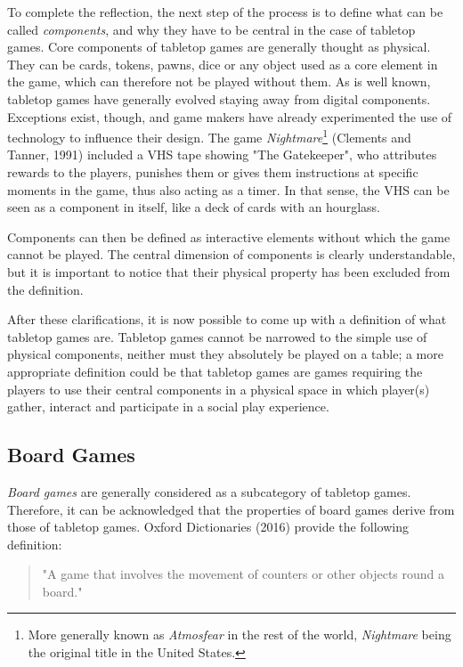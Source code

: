 To complete the reflection, the next step of the process is to define what can be called \textit{components}, and why they have to be central in the case of tabletop games. 
Core components of tabletop games are generally thought as physical. They can be cards, tokens, pawns, dice or any object used as a core element in the game, which can therefore not be played without them. As is well known, tabletop games have generally evolved staying away from digital components. 
Exceptions exist, though, and game makers have already experimented the use of technology to influence their design. The game \textit{Nightmare}\footnote{More generally known as \textit{Atmosfear} in the rest of the world, \textit{Nightmare} being the original title in the United States.}
(Clements and Tanner, 1991) \cite{game:atmo} included a VHS tape showing "The Gatekeeper", who attributes rewards to the players, punishes them or gives them instructions at specific moments in the game, thus also acting as a timer. In that sense, the VHS can be seen as a component in itself, like a deck of cards with an hourglass.

Components can then be defined as interactive elements without which the game cannot be played. The central dimension of components is clearly understandable, but it is important to notice that their physical property has been excluded from the definition.

After these clarifications, it is now possible to come up with a definition of what tabletop games are. Tabletop games cannot be narrowed to the simple use of physical components, neither must they absolutely be played on a table; a more appropriate definition could be that tabletop games are games requiring the players to use their central components in a physical space in which player(s) gather, interact and participate in a social play experience. 

\subsection{Board Games}
\textit{Board games} are generally considered as a subcategory of tabletop games. Therefore, it can be acknowledged that the properties of board games derive from those of tabletop games. Oxford Dictionaries (2016) \cite{web:oxford} provide the following definition:

\begin{quotation}
"A game that involves the movement of counters or other objects round a board."
\end{quotation}

